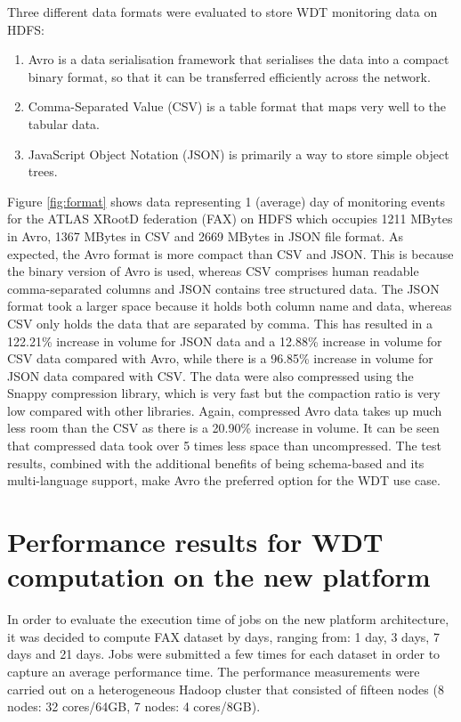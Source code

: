 Three different data formats were evaluated to store WDT monitoring data on HDFS: 
\begin{enumerate}
\item Avro is a data serialisation framework that serialises the data into a compact binary format, so that it can be transferred efficiently across the network.
\item Comma-Separated Value (CSV) is a table format that maps very well to the tabular data.
\item JavaScript Object Notation (JSON) is primarily a way to store simple object trees.
\end{enumerate}
\vspace{5mm}
Figure \ref{fig:format} shows data representing 1 (average) day of monitoring events for the ATLAS XRootD federation (FAX) on HDFS which occupies 1211 MBytes in Avro, 1367 MBytes in CSV and 2669 MBytes in JSON file format. 
As expected, the Avro format is more compact than CSV and JSON. This is because the binary version of Avro is used, whereas CSV comprises human readable comma-separated columns and JSON contains tree structured data. The JSON format took a larger space because it holds both column name and data, whereas CSV only holds the data that are separated by comma. This has resulted in a 122.21\% increase in volume for JSON data and a 12.88\% increase in volume for CSV data compared with Avro, while there is a 96.85\% increase in volume for JSON data compared with CSV. The data were also compressed using the Snappy compression library, which is very fast but the compaction ratio is very low compared with other libraries. Again, compressed Avro data takes up much less room than the CSV as there is a 20.90\% increase in volume. It can be seen that compressed data took over 5 times less space than uncompressed. The test results, combined with the additional benefits of being schema-based and its multi-language support, make Avro the preferred option for the WDT use case.  

\section{Performance results for WDT computation on the new platform}
In order to evaluate the execution time of jobs on the new platform architecture, it was decided to compute FAX dataset by days, ranging from: 1 day, 3 days, 7 days and 21 days. Jobs were submitted a few times for each dataset  in order to capture an average performance time. The performance measurements were carried out on a heterogeneous Hadoop cluster that consisted of fifteen nodes (8 nodes: 32 cores/64GB, 7 nodes: 4 cores/8GB).

